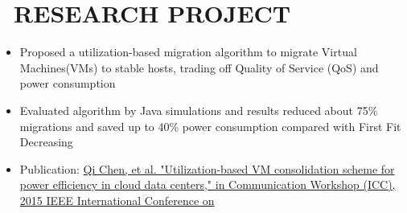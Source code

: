 \documentclass{resume}
\begin{document}
\vspace{-2mm}
\section{\faUsers\ RESEARCH PROJECT}
\vspace{-2mm}
\vspace{-3mm}
\normalsize{
\begin{itemize}
  \item Proposed a utilization-based migration algorithm to migrate Virtual Machines(VMs) to stable hosts, trading off Quality of Service (QoS) and power consumption
  \item Evaluated algorithm by Java simulations and results reduced about 75\% migrations and saved up to 40\% power consumption compared with First Fit Decreasing 
  \item Publication: \href{http://www-scf.usc.edu/~chen147/ICC\%20paper.pdf}{Qi Chen, et al. "Utilization-based VM consolidation scheme for power efficiency in cloud data centers," in Communication Workshop (ICC), 2015 IEEE International Conference on}
\end{itemize}
}


%
%
\end{document}
